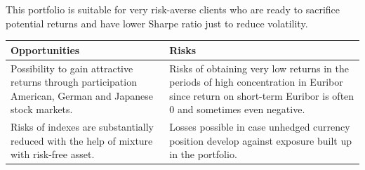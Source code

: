 \documentclass[11pt, parskip=full, DIV=14, headings=small, footsepline, footinclude=false, headsepline]{scrreprt}
\begin{document}


This portfolio is suitable for very risk-averse clients who are ready to sacrifice potential returns and have lower Sharpe ratio just to reduce volatility.

\begin{table}[H]
\begin{tabularx}{\textwidth}{XX}
  \toprule
  \textbf{\textsf{Opportunities}} & \textbf{\textsf{Risks}} \\
  \midrule
Possibility to gain attractive returns through participation American, German and Japanese stock markets.&
Risks of obtaining very low returns in the periods of high concentration in Euribor since  return on short-term Euribor is often 0 and sometimes even negative. \\[1em]
Risks of indexes are substantially reduced with the help of mixture with risk-free asset. &
Losses possible in case unhedged currency position develop against exposure built up in the portfolio.\\
  \bottomrule
\end{tabularx}
\end{table}
\end{document}
